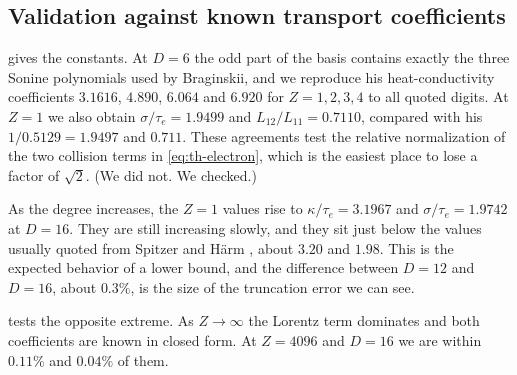 \documentclass[11pt]{article}
\newcommand{\kap}{\kappa}
\newcommand{\thr}{\mathrm{th}}
\theoremstyle{definition}
\theoremstyle{remark}
\numberwithin{equation}{section}
\begin{document}
\subsection{Validation against known transport coefficients}

\begin{table}[tb]
\centering
\caption{Electron transport coefficients versus ion charge, with
$\kap$ and $\sigma=L_{11}$ in units of $\tau_e$ and subscripts giving the
degree $D$. The column ``Brag.'' quotes Braginskii's coefficient
$\gamma_0$ \cite{Braginskii1965}. The last three columns give the leading
deficit coefficient in units of $\lambda_e^2$ and in normalized form; $K$ in the
column heads is $K_\thr$.}
\label{tab:th-electron}
\small

\end{table}

 gives the constants. At $D=6$ the odd part of the
basis contains exactly the three Sonine polynomials used by Braginskii,
and we reproduce his heat-conductivity coefficients $3.1616$, $4.890$,
$6.064$ and $6.920$ for $Z=1,2,3,4$ to all quoted digits. At $Z=1$ we
also obtain $\sigma/\tau_e=1.9499$ and $L_{12}/L_{11}=0.7110$, compared
with his $1/0.5129=1.9497$ and $0.711$. These agreements test the relative
normalization of the two collision terms in \eqref{eq:th-electron}, which is
the easiest place to lose a factor of $\sqrt2$. (We did not. We checked.)

As the degree increases, the $Z=1$ values rise to $\kap/\tau_e=3.1967$ and
$\sigma/\tau_e=1.9742$ at $D=16$. They are still increasing slowly, and
they sit just below the values usually quoted from Spitzer and H\"arm
\cite{SpitzerHarm1953}, about $3.20$ and $1.98$. This is the expected
behavior of a lower bound, and the difference between $D=12$ and $D=16$,
about $0.3\%$, is the size of the truncation error we can see.

\begin{table}[tb]
\centering
\caption{Approach to the Lorentz limit $Z\to\infty$, where
$\sigma/\tau_e=32/(3\pi)$ and $\kap/\tau_e=128/(3\pi)$ in closed form.}
\label{tab:th-lorentz}
\small

\end{table}

 tests the opposite extreme. As $Z\to\infty$ the
Lorentz term dominates and both coefficients are known in closed form. At
$Z=4096$ and $D=16$ we are within $0.11\%$ and $0.04\%$ of them.
\end{document}
